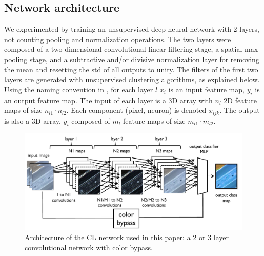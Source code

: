 \documentclass{article} %
\begin{document}
\subsection{Network architecture}
\label{sec-net-arch}

We experimented by training an unsupervised deep neural network with 2 layers, not counting pooling and normalization operations. The two layers were composed of a two-dimensional convolutional linear filtering stage, a spatial max pooling stage, and a subtractive and/or divisive normalization layer for removing the mean and resetting the std of all outputs to unity. 
The filters of the first two layers are generated with unsupervised clustering algorithms, as explained below. 
Using the naming convention in \cite{lecun_convolutional_2010}, for each layer $l$  $x_i$ is an input feature map, $y_i$ is an output feature map. The input of each layer is a 3D array with $n_l$ 2D feature maps of size $n_{l1} \cdot n_{l2}$. Each component (pixel, neuron) is denoted $x_{ijk}$. The output is also a 3D array, $y_i$ composed of $m_l$ feature maps of size $m_{l1} \cdot m_{l2}$.


\begin{figure}
\includegraphics[width=5in]{fig-netarch.pdf}
\caption{Architecture of the CL network used in this paper: a 2 or 3 layer convolutional network with color bypass.}
\label{fig-netarch}
\end{figure}
\end{document}
